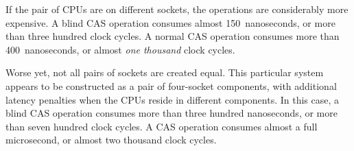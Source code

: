 If the pair of CPUs are on different sockets, the operations are considerably
more expensive.
A blind CAS operation consumes almost 150~nanoseconds, or more than
three hundred clock cycles.
A normal CAS operation consumes more than 400~nanoseconds, or almost
\emph{one thousand} clock cycles.

Worse yet, not all pairs of sockets are created equal.
This particular system appears to be constructed as a pair of four-socket
components, with additional latency penalties when the CPUs reside
in different components.
In this case, a blind CAS operation consumes more than three hundred
nanoseconds, or more than seven hundred clock cycles.
A CAS operation consumes almost a full microsecond, or almost two
thousand clock cycles.

